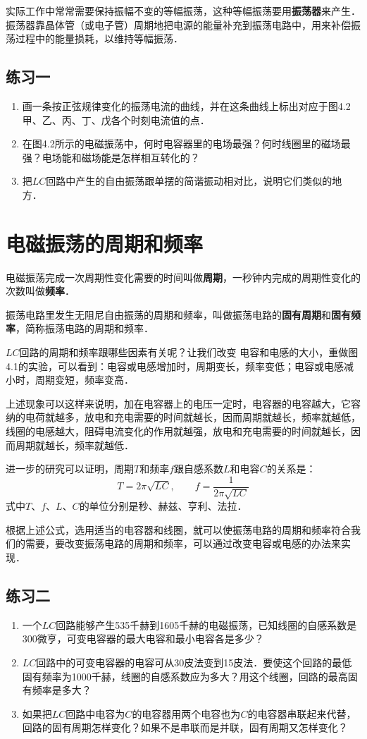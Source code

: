 实际工作中常常需要保持振幅不变的等幅振荡，这种等幅振荡要用\textbf{振荡器}来产生．振荡器靠晶体管（或电子管）周期地把电源的能量补充到振荡电路中，用来补偿振荡过程中的能量损耗，以维持等幅振荡．

\subsection*{练习一}
\begin{enumerate}
	\item 画一条按正弦规律变化的振荡电流的曲线，并在这条曲线上标出对应于图4.2甲、乙、丙、丁、戊各个时刻电流值的点．
	\item 在图4.2所示的电磁振荡中，何时电容器里的电场最强？何时线圈里的磁场最强？电场能和磁场能是怎样相互转化的？
	\item 把$LC$回路中产生的自由振荡跟单摆的简谐振动相对比，说明它们类似的地方．
\end{enumerate}


\section{电磁振荡的周期和频率}
电磁振荡完成一次周期性变化需要的时间叫做\textbf{周期}，一秒钟内完成的周期性变化的次数叫做\textbf{频率}．

振荡电路里发生无阻尼自由振荡的周期和频率，叫做振荡电路的\textbf{固有周期}和\textbf{固有频率}，简称振荡电路的周期和频率．

$LC$回路的周期和频率跟哪些因素有关呢？让我们改变
电容和电感的大小，重做图4.1的实验，可以看到：电容或电感增加时，周期变长，频率变低；电容或电感减小时，周期变短，频率变高．

上述现象可以这样来说明，加在电容器上的电压一定时，电容器的电容越大，它容纳的电荷就越多，放电和充电需要的时间就越长，因而周期就越长，频率就越低，线圈的电感越大，阻碍电流变化的作用就越强，放电和充电需要的时间就越长，因而周期就越长，频率就越低．

进一步的研究可以证明，周期$T$和频率$f$跟自感系数$L$和电容$C$的关系是：
\[T=2\pi\sqrt{LC},\qquad f=\frac{1}{2\pi\sqrt{LC}} \]
式中$T$、$f$、$L$、$C$的单位分别是秒、赫兹、亨利、法拉．

根据上述公式，选用适当的电容器和线圈，就可以使振荡电路的周期和频率符合我们的需要，要改变振荡电路的周期和频率，可以通过改变电容或电感的办法来实现．

\subsection*{练习二}
\begin{enumerate}
	\item 一个$LC$回路能够产生535千赫到1605千赫的电磁振荡，已知线圈的自感系数是300微亨，可变电容器的最大电容和最小电容各是多少？
	\item $LC$回路中的可变电容器的电容可从30皮法变到15皮法．要使这个回路的最低固有频率为1000千赫，线圈的自感系数应为多大？用这个线圈，回路的最高固有频率是多大？
	\item 如果把$LC$回路中电容为$C$的电容器用两个电容也为$C$的电容器串联起来代替，回路的固有周期怎样变化？如果不是串联而是并联，固有周期又怎样变化？
\end{enumerate}


